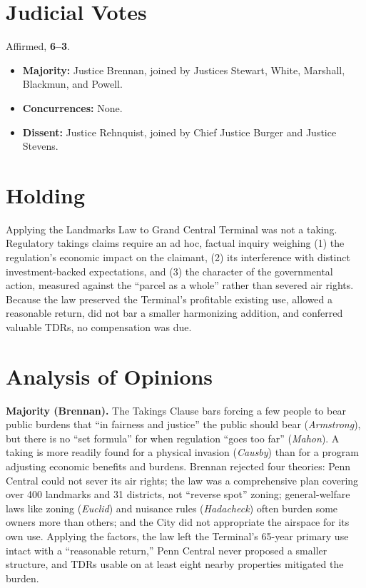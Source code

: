 \documentclass[12pt]{article}
\begin{document}
\section{Judicial Votes}

Affirmed, \textbf{6--3}.
\begin{itemize}
\item \textbf{Majority:} Justice Brennan, joined by Justices Stewart, White, Marshall, Blackmun, and Powell.
\item \textbf{Concurrences:} None.
\item \textbf{Dissent:} Justice Rehnquist, joined by Chief Justice Burger and Justice Stevens.
\end{itemize}

\section{Holding}

Applying the Landmarks Law to Grand Central Terminal was not a taking. Regulatory takings claims require an ad hoc, factual inquiry weighing (1) the regulation's economic impact on the claimant, (2) its interference with distinct investment-backed expectations, and (3) the character of the governmental action, measured against the ``parcel as a whole'' rather than severed air rights. Because the law preserved the Terminal's profitable existing use, allowed a reasonable return, did not bar a smaller harmonizing addition, and conferred valuable TDRs, no compensation was due.

\section{Analysis of Opinions}

\textbf{Majority (Brennan).} The Takings Clause bars forcing a few people to bear public burdens that ``in fairness and justice'' the public should bear (\textit{Armstrong}), but there is no ``set formula'' for when regulation ``goes too far'' (\textit{Mahon}). A taking is more readily found for a physical invasion (\textit{Causby}) than for a program adjusting economic benefits and burdens. Brennan rejected four theories: Penn Central could not sever its air rights; the law was a comprehensive plan covering over 400 landmarks and 31 districts, not ``reverse spot'' zoning; general-welfare laws like zoning (\textit{Euclid}) and nuisance rules (\textit{Hadacheck}) often burden some owners more than others; and the City did not appropriate the airspace for its own use. Applying the factors, the law left the Terminal's 65-year primary use intact with a ``reasonable return,'' Penn Central never proposed a smaller structure, and TDRs usable on at least eight nearby properties mitigated the burden.
\end{document}
